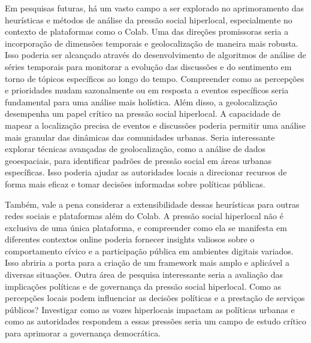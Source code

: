 Em pesquisas futuras, há um vasto campo a ser explorado no aprimoramento das heurísticas e métodos de análise da pressão social hiperlocal, especialmente no contexto de plataformas como o Colab. Uma das direções promissoras seria a incorporação de dimensões temporais e geolocalização de maneira mais robusta. Isso poderia ser alcançado através do desenvolvimento de algoritmos de análise de séries temporais para monitorar a evolução das discussões e do sentimento em torno de tópicos específicos ao longo do tempo. Compreender como as percepções e prioridades mudam sazonalmente ou em resposta a eventos específicos seria fundamental para uma análise mais holística. Além disso, a geolocalização desempenha um papel crítico na pressão social hiperlocal. A capacidade de mapear a localização precisa de eventos e discussões poderia permitir uma análise mais granular das dinâmicas das comunidades urbanas. Seria interessante explorar técnicas avançadas de geolocalização, como a análise de dados geoespaciais, para identificar padrões de pressão social em áreas urbanas específicas. Isso poderia ajudar as autoridades locais a direcionar recursos de forma mais eficaz e tomar decisões informadas sobre políticas públicas.

Também, vale a pena considerar a extensibilidade dessas heurísticas para outras redes sociais e plataformas além do Colab. A pressão social hiperlocal não é exclusiva de uma única plataforma, e compreender como ela se manifesta em diferentes contextos online poderia fornecer insights valiosos sobre o comportamento cívico e a participação pública em ambientes digitais variados. Isso abriria a porta para a criação de um framework mais amplo e aplicável a diversas situações. Outra área de pesquisa interessante seria a avaliação das implicações políticas e de governança da pressão social hiperlocal. Como as percepções locais podem influenciar as decisões políticas e a prestação de serviços públicos? Investigar como as vozes hiperlocais impactam as políticas urbanas e como as autoridades respondem a essas pressões seria um campo de estudo crítico para aprimorar a governança democrática.

